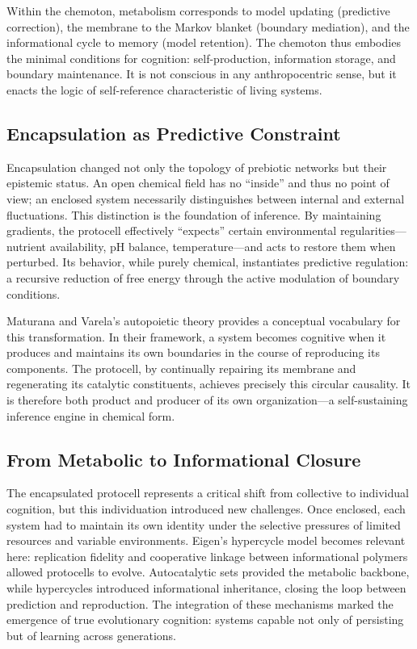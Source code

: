\documentclass[11pt,a4paper]{article}
\begin{document}
Within the chemoton, metabolism corresponds to model updating (predictive correction), the membrane to the Markov blanket (boundary mediation), and the informational cycle to memory (model retention).  The chemoton thus embodies the minimal conditions for cognition: self-production, information storage, and boundary maintenance.  It is not conscious in any anthropocentric sense, but it enacts the logic of self-reference characteristic of living systems.  

\subsection{Encapsulation as Predictive Constraint}

Encapsulation changed not only the topology of prebiotic networks but their epistemic status.  An open chemical field has no ``inside'' and thus no point of view; an enclosed system necessarily distinguishes between internal and external fluctuations.  This distinction is the foundation of inference.  By maintaining gradients, the protocell effectively ``expects'' certain environmental regularities—nutrient availability, pH balance, temperature—and acts to restore them when perturbed.  Its behavior, while purely chemical, instantiates predictive regulation: a recursive reduction of free energy through the active modulation of boundary conditions.

Maturana and Varela’s autopoietic theory \citep{MaturanaVarela1980Autopoiesis} provides a conceptual vocabulary for this transformation.  In their framework, a system becomes cognitive when it produces and maintains its own boundaries in the course of reproducing its components.  The protocell, by continually repairing its membrane and regenerating its catalytic constituents, achieves precisely this circular causality.  It is therefore both product and producer of its own organization—a self-sustaining inference engine in chemical form.

\subsection{From Metabolic to Informational Closure}

The encapsulated protocell represents a critical shift from collective to individual cognition, but this individuation introduced new challenges.  Once enclosed, each system had to maintain its own identity under the selective pressures of limited resources and variable environments.  Eigen’s hypercycle model \citep{Eigen1971Selforganization, Eigen1979HypercycleBook} becomes relevant here: replication fidelity and cooperative linkage between informational polymers allowed protocells to evolve.  Autocatalytic sets provided the metabolic backbone, while hypercycles introduced informational inheritance, closing the loop between prediction and reproduction.  The integration of these mechanisms marked the emergence of true evolutionary cognition: systems capable not only of persisting but of learning across generations.
\end{document}
